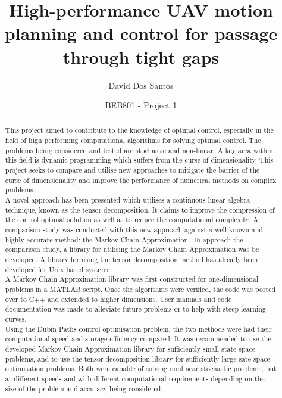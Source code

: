 \documentclass[11pt,draftd]{article}
\begin{document}
\title{High-performance UAV motion planning and control for passage through tight gaps}
\author{David Dos Santos}
\date{BEB801 - Project 1}
\maketitle

\[\]
\[\]
\[\]
\renewcommand{\abstractname}{Executive Summary}
\begin{abstract}
	\[\]
	This project aimed to contribute to the knowledge of optimal control, especially in the field of high performing computational algorithms for solving optimal control. The problems being considered and tested are stochastic and non-linear. A key area within this field is dynamic programming which suffers from the curse of dimensionality. This project seeks to compare and utilise new approaches to mitigate the barrier of the curse of dimensionality and improve the performance of numerical methods on complex problems. \\
	
	\noindent A novel approach has been presented which utilises a continuous linear algebra technique, known as the tensor decomposition. It claims to improve the compression of the control optimal solution as well as to reduce the computational complexity. A comparison study was conducted with this new approach against a well-known and highly accurate method: the Markov Chain Approximation. To approach the comparison study, a library for utilising the Markov Chain Approximation was be developed. A library for using the tensor decomposition method has already been developed for Unix based systems. \\
	
	\noindent A Markov Chain Approximation library was first constructed for one-dimensional problems in a MATLAB script. Once the algorithms were verified, the code was ported over to C++ and extended to higher dimensions. User manuals and code documentation was made to alleviate future problems or to help with steep learning curves. \\
	
	\noindent Using the Dubin Paths control optimisation problem, the two methods were had their computational speed and storage efficiency compared. It was recommended to use the developed Markov Chain Approximation library for sufficiently small state space problems, and to use the tensor decomposition library for sufficiently large sate space optimisation problems. Both were capable of solving nonlinear stochastic problems, but at different speeds and with different computational requirements depending on the size of the problem and accuracy being considered. \\
	

\end{abstract}
\end{document}
